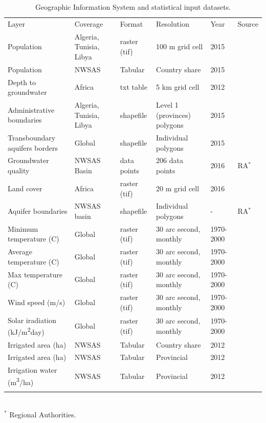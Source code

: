 \documentclass[12pt]{iopart}
\begin{document}
\begin{table}[!h]
	\caption{\label{tbl:datasources}Geographic Information System and statistical input datasets.}
	{\footnotesize
		\begin{tabular*}{\textwidth}{@{}P{1.4in} P{1in} l P{1.2in} l l@{}}
			\br
			Layer & Coverage & Format & Resolution & Year & Source\\
			\mr
			Population & Algeria, Tunisia, Libya & raster (tif) & 100 m grid cell & 2015 & \cite{Worldpop2012}\\\ms
			Population & NWSAS & Tabular & Country share & 2015 & \cite{BetterValorizationIrrigation2015} \\\ms			
			Depth to groundwater & Africa & txt table & 5 km grid cell & 2012 & \cite{Quantitativemapsgroundwater2012a}\\\ms
			Administrative boundaries & Algeria, Tunisia, Libya & shapefile & Level 1 (provinces) polygons & 2015 & \cite{GADM}\\\ms
			Transboundary aquifers borders & Global & shapefile & Individual polygons & 2015 & \cite{IGRAC}\\\ms
			Groundwater quality & NWSAS Basin & data points & 206 data points & 2016 & RA$^*$\\\ms
			Land cover & Africa & raster (tif) & 20 m grid cell & 2016 & \cite{ESA2017}\\\ms
			Aquifer boundaries & NWSAS basin & shapefile & Individual polygons & - & RA$^*$\\\ms
			Minimum temperature (\degree C) & Global & raster (tif) & 30 arc second, monthly & 1970-2000 & \cite{WorldClimGlobalClimate}\\\ms
			Average temperature (\degree C) & Global & raster (tif) & 30 arc second, monthly & 1970-2000 & \cite{WorldClimGlobalClimate}\\\ms
			Max temperature (\degree C) & Global & raster (tif) & 30 arc second, monthly & 1970-2000 & \cite{WorldClimGlobalClimate}\\\ms
			Wind speed (m/s) & Global & raster (tif) & 30 arc second, monthly & 1970-2000 & \cite{WorldClimGlobalClimate}\\\ms
			Solar iradiation (kJ/m\textsuperscript{2}day) & Global & raster (tif) & 30 arc second, monthly & 1970-2000 & \cite{WorldClimGlobalClimate}\\\ms
			Irrigated area (ha) & NWSAS & Tabular & Country share & 2012 & \cite{BetterValorizationIrrigation2015} \\\ms	
			Irrigated area (ha) & NWSAS & Tabular & Provincial & 2012 & \cite{Socioeconomicaspectsirrigation2014} \\\ms	
			Irrigation water (m\textsuperscript{3}/ha) & NWSAS & Tabular & Provincial & 2012 & \cite{Socioeconomicaspectsirrigation2014} \\
			\br
		\end{tabular*}\\
		$^*$ Regional Authorities.
	}
\end{table}
\end{document}
